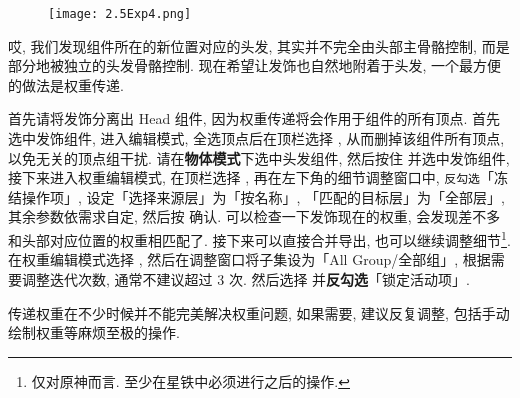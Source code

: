                 \begin{figure}[H]
                    \centering
                    \texttt{[image: 2.5Exp4.png]}
                \end{figure}
            哎, 我们发现组件所在的新位置对应的头发, 其实并不完全由头部主骨骼控制, 而是部分地被独立的头发骨骼控制. 现在希望让发饰也自然地附着于头发, 一个最方便的做法是权重传递.
            \par 首先请将发饰分离出 Head 组件, 因为权重传递将会作用于组件的所有顶点. 首先选中发饰组件, 进入编辑模式, 全选顶点后在顶栏选择 , 从而删掉该组件所有顶点, 以免无关的顶点组干扰. 请在\textbf{物体模式}下选中头发组件, 然后按住  并选中发饰组件, 接下来进入权重编辑模式, 在顶栏选择 , 再在左下角的细节调整窗口中, \texttt{反勾选}「冻结操作项」, 设定「选择来源层」为「按名称」, 「匹配的目标层」为「全部层」, 其余参数依需求自定, 然后按  确认. 可以检查一下发饰现在的权重, 会发现差不多和头部对应位置的权重相匹配了. 接下来可以直接合并导出, 也可以继续调整细节\footnote{仅对原神而言. 至少在星铁中必须进行之后的操作.}. 在权重编辑模式选择 , 然后在调整窗口将子集设为「All Group/全部组」, 根据需要调整迭代次数, 通常不建议超过 3 次. 然后选择  并\textbf{反勾选}「锁定活动项」.
            \par 传递权重在不少时候并不能完美解决权重问题, 如果需要, 建议反复调整, 包括手动绘制权重等麻烦至极的操作.
